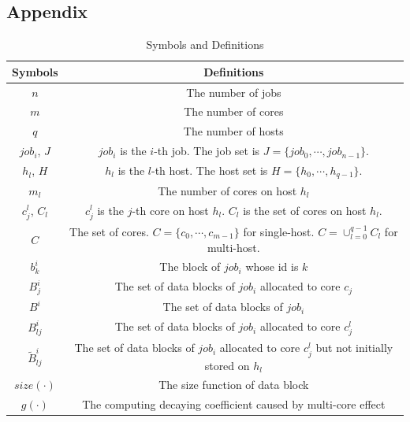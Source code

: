 \documentclass{llncs}
\begin{document}

%
%
%
%
% 
%

\begin{appendices}
\section*{Appendix}

\begin{table}[htbp]
\caption{Symbols and Definitions}
\begin{center}
\begin{tabular}{c|c}
\toprule
\textbf{Symbols} &\textbf{Definitions}  \\
\midrule
$n$ & The number of jobs  \\
$m$ & The number of cores \\
$q$ & The number of hosts  \\
$job_i$, $J$ & $job_i$ is the $i$-th job. The job set is $J=\{job_0, \cdots, job_{n-1}\}$. \\
$h_l$, $H$ & $h_l$ is the $l$-th  host. The host set is $H=\{h_0, \cdots, h_{q-1}\}$. \\
$m_l$ & The number of cores on host $h_l$\\
$c^l_j$, $C_l$ & $c^l_j$ is the $j$-th core on host $h_l$. $C_l$ is the set of cores on host $h_l$.\\
$C$ & The set of cores. $C=\{c_0,\cdots,c_{m-1}\}$ for single-host. $C=\cup_{l=0}^{q-1} C_l$ for multi-host.\\
$b^i_k$& The block of $job_i$ whose id is $k$\\
$B^i_{j}$ & The set of data blocks of $job_i$ allocated to core $c_j$ \\
$B^i$ & The set of data blocks of $job_i$ \\
$B^i_{lj}$ & The set of data blocks of $job_i$ allocated to core $c^l_j$ \\
$\widetilde{B}^i_{lj}$ & The set of data blocks of $job_i$ allocated to core $c^l_j$ but not initially stored on $h_l$\\
$size(\cdot)$ & The size function of data block\\
$g(\cdot)$ &  The computing decaying coefficient caused by multi-core effect\\

\end{tabular}
\end{center}
\end{table}
\end{appendices}
\end{document}
